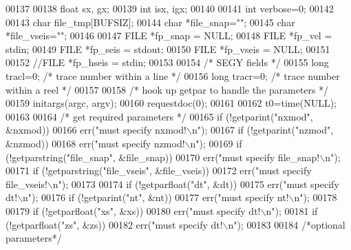 \begin{DoxyCode}
00137 
00138     \textcolor{keywordtype}{float} sx, gx;
00139     \textcolor{keywordtype}{int} isx, igx;
00140 
00141     \textcolor{keywordtype}{int} verbose=0;
00142 
00143     \textcolor{keywordtype}{char} file\_tmp[BUFSIZ];
00144     \textcolor{keywordtype}{char} *file\_snap=\textcolor{stringliteral}{""};
00145     \textcolor{keywordtype}{char} *file\_vseis=\textcolor{stringliteral}{""};
00146 
00147     FILE *fp\_snap = NULL;
00148     FILE *fp\_vel = stdin;
00149     FILE *fp\_seis = stdout;
00150     FILE *fp\_vseis = NULL;
00151 
00152     \textcolor{comment}{//FILE *fp\_hseis = stdin;}
00153 
00154     \textcolor{comment}{/* SEGY fields */}
00155     \textcolor{keywordtype}{long} tracl=0;       \textcolor{comment}{/* trace number within a line */}
00156     \textcolor{keywordtype}{long} tracr=0;       \textcolor{comment}{/* trace number within a reel */}
00157 
00158     \textcolor{comment}{/* hook up getpar to handle the parameters */}
00159     initargs(argc, argv);
00160     requestdoc(0);
00161 
00162     t0=time(NULL);
00163 
00164     \textcolor{comment}{/* get required parameters */}
00165     \textcolor{keywordflow}{if} (!getparint(\textcolor{stringliteral}{"nxmod"}, &nxmod))
00166         err(\textcolor{stringliteral}{"must specify nxmod!\(\backslash\)n"});
00167     \textcolor{keywordflow}{if} (!getparint(\textcolor{stringliteral}{"nzmod"}, &nzmod))
00168         err(\textcolor{stringliteral}{"must specify nzmod!\(\backslash\)n"});
00169     \textcolor{keywordflow}{if} (!getparstring(\textcolor{stringliteral}{"file\_snap"}, &file\_snap))
00170         err(\textcolor{stringliteral}{"must specify file\_snap!\(\backslash\)n"});
00171     \textcolor{keywordflow}{if} (!getparstring(\textcolor{stringliteral}{"file\_vseis"}, &file\_vseis))
00172         err(\textcolor{stringliteral}{"must specify file\_vseis!\(\backslash\)n"});
00173 
00174     \textcolor{keywordflow}{if} (!getparfloat(\textcolor{stringliteral}{"dt"}, &dt))
00175         err(\textcolor{stringliteral}{"must specify dt!\(\backslash\)n"});
00176     \textcolor{keywordflow}{if} (!getparint(\textcolor{stringliteral}{"nt"}, &nt))
00177         err(\textcolor{stringliteral}{"must specify nt!\(\backslash\)n"});
00178 
00179     \textcolor{keywordflow}{if} (!getparfloat(\textcolor{stringliteral}{"xs"}, &xs))
00180         err(\textcolor{stringliteral}{"must specify dt!\(\backslash\)n"});
00181     \textcolor{keywordflow}{if} (!getparfloat(\textcolor{stringliteral}{"zs"}, &zs))
00182         err(\textcolor{stringliteral}{"must specify dt!\(\backslash\)n"});
00183 
00184     \textcolor{comment}{/*optional parameters*/}

\end{DoxyCode}
